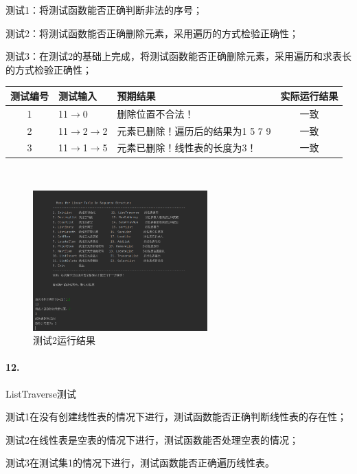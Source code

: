 \documentclass[supercite]{Experimental_Report}
\theoremstyle{definition}
\begin{document}
	测试1：将测试函数能否正确判断非法的序号；

	测试2：将测试函数能否正确删除元素，采用遍历的方式检验正确性；

	测试3：在测试2的基础上完成，将测试函数能否正确删除元素，采用遍历和求表长的方式检验正确性；

\vspace{0.5em}

\begin{tabular}{|c|p{2.7cm}|p{4.5cm}|c|}
	\hline
	测试编号 & 测试输入 & 预期结果 & 实际运行结果 \\
	\hline
	1 & 11$\rightarrow$0 & 删除位置不合法！ & 一致 \\
	\hline
	2 & 11$\rightarrow$2$\rightarrow$2 & 元素已删除！遍历后的结果为1 5 7 9 & 一致 \\
	\hline
	3 & 11$\rightarrow$1$\rightarrow$5 & 元素已删除！线性表的长度为3！ & 一致 \\
	\hline
\end{tabular}

~\

 \begin{figure}[H]
 	\centering
 	\includegraphics[width=0.6\textwidth]{images/线性表测试11.png}
 	\caption{测试2运行结果}
 	\label{txlab}
 \end{figure}


\paragraph{12.}ListTraverse测试

	测试1在没有创建线性表的情况下进行，测试函数能否正确判断线性表的存在性；

	测试2在线性表是空表的情况下进行，测试函数能否处理空表的情况；

	测试3在测试集1的情况下进行，测试函数能否正确遍历线性表。

\vspace{0.5em}
\end{document}
